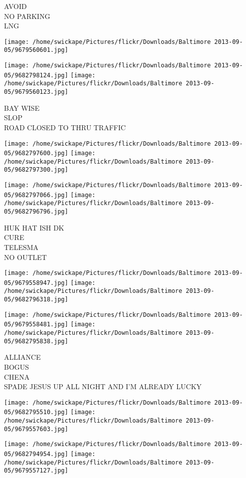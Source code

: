 \documentclass[10pt,letterpaper]{article}
\begin{document}
AVOID\\
NO PARKING\\
LNG
\pagebreak

\texttt{[image: /home/swickape/Pictures/flickr/Downloads/Baltimore 2013-09-05/9679560601.jpg]}

\vspace{0.25in}
\texttt{[image: /home/swickape/Pictures/flickr/Downloads/Baltimore 2013-09-05/9682798124.jpg]}
\texttt{[image: /home/swickape/Pictures/flickr/Downloads/Baltimore 2013-09-05/9679560123.jpg]}

BAY WISE\\
SLOP\\
ROAD CLOSED TO THRU TRAFFIC
\pagebreak

\texttt{[image: /home/swickape/Pictures/flickr/Downloads/Baltimore 2013-09-05/9682797600.jpg]}
\texttt{[image: /home/swickape/Pictures/flickr/Downloads/Baltimore 2013-09-05/9682797300.jpg]}

\texttt{[image: /home/swickape/Pictures/flickr/Downloads/Baltimore 2013-09-05/9682797066.jpg]}
\texttt{[image: /home/swickape/Pictures/flickr/Downloads/Baltimore 2013-09-05/9682796796.jpg]}

HUK HAT ISH DK\\
CURE\\
TELESMA\\
NO OUTLET
\pagebreak

\texttt{[image: /home/swickape/Pictures/flickr/Downloads/Baltimore 2013-09-05/9679558947.jpg]}
\texttt{[image: /home/swickape/Pictures/flickr/Downloads/Baltimore 2013-09-05/9682796318.jpg]}

\texttt{[image: /home/swickape/Pictures/flickr/Downloads/Baltimore 2013-09-05/9679558481.jpg]}
\texttt{[image: /home/swickape/Pictures/flickr/Downloads/Baltimore 2013-09-05/9682795838.jpg]}

ALLIANCE\\
BOGUS\\
CHENA\\
SPADE JESUS UP ALL NIGHT AND I'M ALREADY LUCKY
\pagebreak

\texttt{[image: /home/swickape/Pictures/flickr/Downloads/Baltimore 2013-09-05/9682795510.jpg]}
\texttt{[image: /home/swickape/Pictures/flickr/Downloads/Baltimore 2013-09-05/9679557603.jpg]}

\texttt{[image: /home/swickape/Pictures/flickr/Downloads/Baltimore 2013-09-05/9682794954.jpg]}
\texttt{[image: /home/swickape/Pictures/flickr/Downloads/Baltimore 2013-09-05/9679557127.jpg]}
\end{document}
